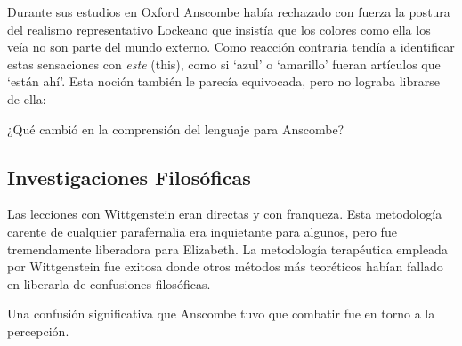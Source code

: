 Durante sus estudios en Oxford Anscombe había rechazado con fuerza la postura
del realismo representativo Lockeano que insistía que los colores como ella los
veía no son parte del mundo externo. Como reacción contraria tendía a
identificar estas sensaciones con \emph{este} (this), como si `azul' o
`amarillo' fueran artículos que `están ahí'. Esta noción también le parecía
equivocada, pero no lograba librarse de ella:

¿Qué cambió en la comprensión del lenguaje para Anscombe?

\subsection{Investigaciones Filosóficas}
      Las lecciones con Wittgenstein eran directas y con franqueza. Esta metodología
      carente de cualquier parafernalia era inquietante para algunos, pero fue
      tremendamente liberadora para Elizabeth. La metodología terapéutica empleada por
      Wittgenstein fue exitosa donde otros métodos más teoréticos habían fallado en
      liberarla de confusiones filosóficas.\autocite[loc 9853 Chapter 4, Section 24,
      \S5]{monk1991duty}

      Una confusión significativa que Anscombe tuvo que combatir fue en torno a la
      percepción.

